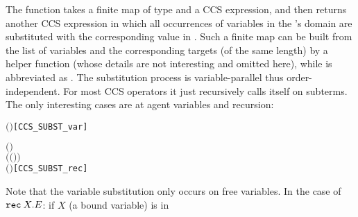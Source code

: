 The function  takes a finite
map  of type  and a CCS expression,
and then returns another CCS expression in which
all occurrences of variables in the 's domain are substituted with
the corresponding value in . Such a finite map can be built from
the list of variables  and the corresponding targets
 (of the same length) by a helper function  (whose details are
not interesting and omitted here), while
 is
abbreviated as .
The substitution process is
variable-parallel thus order-independent. For most CCS operators it
just recursively calls itself on subterms. The only
interesting cases are at agent variables and recursion:
\begin{alltt}
     \ensuremath{(} \ensuremath{)} \HOLSymConst{\HOLTokenDefEquality{}}   \HOLSymConst{\HOLTokenIn{}}         \hfill{[CCS_SUBST_var]}

     \ensuremath{(}  \ensuremath{)} \HOLSymConst{\HOLTokenDefEquality{}}
       \HOLSymConst{\HOLTokenIn{}}      \ensuremath{(} \ensuremath{(} \HOLSymConst{\ensuremath{\setminus}} \ensuremath{)} \ensuremath{)}
        \ensuremath{(}  \ensuremath{)}\hfill{[CCS_SUBST_rec]}
\end{alltt}
Note that the variable substitution only occurs on free
variables. In the case of ${\tt rec}\: X . E$: if $X$ (a bound variable) is in
